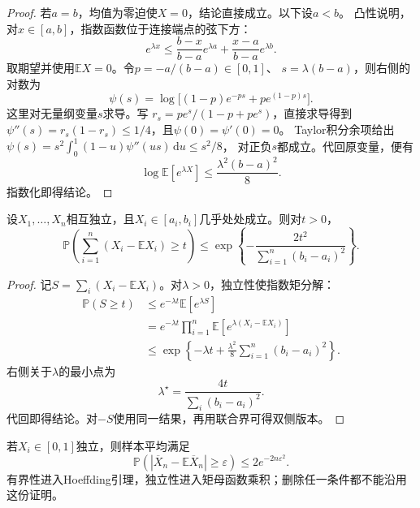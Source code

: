 \begin{proof}
若\(a=b\)，均值为零迫使\(X=0\)，结论直接成立。以下设\(a<b\)。
凸性说明，对\(x\in[a,b]\)，指数函数位于连接端点的弦下方：
\[ e^{\lambda x}
  \leq\frac{b-x}{b-a}e^{\lambda a}+\frac{x-a}{b-a}e^{\lambda b}. \]
取期望并使用\(\mathbb{E}X=0\)。令\(p=-a/(b-a)\in[0,1]\)、
\(s=\lambda(b-a)\)，则右侧的对数为
\[
 \psi(s)=\log\bigl[(1-p)e^{-ps}+pe^{(1-p)s}\bigr].
\]
这里对无量纲变量\(s\)求导。写
\(r_s=pe^s/(1-p+pe^s)\)，直接求导得到
\(\psi''(s)=r_s(1-r_s)\leq1/4\)，且\(\psi(0)=\psi'(0)=0\)。
Taylor积分余项给出
\(\psi(s)=s^2\int_0^1(1-u)\psi''(us)\,\mathrm du\leq s^2/8\)，
对正负\(s\)都成立。代回原变量，便有
\[ \log\mathbb{E}[e^{\lambda X}]
  \leq\frac{\lambda^2(b-a)^2}{8}. \]
指数化即得结论。
\end{proof}

\begin{theorem}[Hoeffding不等式]
\label{thm:probability-hoeffding-inequality}
设\(X_1,\ldots,X_n\)相互独立，且\(X_i\in[a_i,b_i]\)几乎处处成立。则对\(t>0\)，
\[
  \mathbb{P}\left(
    \sum_{i=1}^{n}(X_i-\mathbb{E}X_i)\geq t
  \right)
  \leq
  \exp\left\{
    -\frac{2t^2}{\sum_{i=1}^{n}(b_i-a_i)^2}
  \right\}.
\]
\end{theorem}

\begin{proof}
记\(S=\sum_i(X_i-\mathbb{E}X_i)\)。对\(\lambda>0\)，独立性使指数矩分解：
\[
\begin{aligned}
  \mathbb{P}(S\geq t)
  &\leq
  e^{-\lambda t}\mathbb{E}[e^{\lambda S}]\\
  &=
  e^{-\lambda t}
  \prod_{i=1}^{n}
  \mathbb{E}\left[
    e^{\lambda(X_i-\mathbb{E}X_i)}
  \right]\\
  &\leq
  \exp\left\{
    -\lambda t+
    \frac{\lambda^2}{8}
    \sum_{i=1}^{n}(b_i-a_i)^2
  \right\}.
\end{aligned}
\]
右侧关于\(\lambda\)的最小点为
\[ \lambda^\star
  =\frac{4t}{\sum_i(b_i-a_i)^2}. \]
代回即得结论。对\(-S\)使用同一结果，再用联合界可得双侧版本。
\end{proof}

若\(X_i\in[0,1]\)独立，则样本平均满足
\[ \mathbb{P}(|\overline{X}_n-\mathbb{E}\overline{X}_n|
  \geq\varepsilon)\leq 2e^{-2n\varepsilon^2}. \]
有界性进入Hoeffding引理，独立性进入矩母函数乘积；删除任一条件都不能沿用这份证明。

